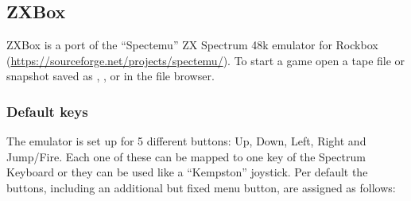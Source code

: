 \subsection{\label{ref:ZXBox}ZXBox}
ZXBox is a port of the ``Spectemu'' ZX Spectrum 48k emulator for Rockbox
(\url{https://sourceforge.net/projects/spectemu/}).
To start a game open a tape file or snapshot saved as
, ,  or  in the file browser.\\

\subsubsection{Default keys}
The emulator is set up for 5 different buttons: Up, Down, Left, Right and
Jump/Fire. Each one of these can be mapped to one key of the Spectrum Keyboard
or they can be used like a ``Kempston'' joystick. Per default the buttons,
including an additional but fixed menu button, are assigned as follows:

